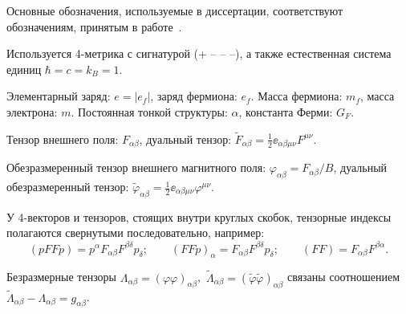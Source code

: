 \intro

%
%

\actualitysection
\actualitytext

\developmentsection
\developmenttext

\objectivesection
\objectivetext

\noveltysection
\noveltytext

{}

\methodssection
\methodstext

\resultssection
\resultstext

\approbationsection
\approbationtext

\pubsection
\pubtext

\contribsection
\contribtext

\structsection
\structtext

\newpage

Основные обозначения, используемые в диссертации, соответствуют обозначениям, принятым в работе~\cite{KM_Book_2013}.

Используется 4-метрика с сигнатурой (+ -- -- --), 
а также естественная система единиц $\hbar=c=k_B = 1$.

Элементарный заряд: $e = |e_f|$, заряд фермиона: $e_f$. Масса фермиона: $m_f$, масса электрона: $m$. Постоянная тонкой структуры: $\alpha$, 
константа Ферми: $G_F$.

Тензор внешнего поля: $F_{\alpha \beta}$, 
дуальный тензор: 
${\tilde F}_{\alpha \beta} = \frac{1}{2} \ee_{\alpha \beta
\mu \nu} F^{\mu \nu}$.

Обезразмеренный тензор внешнего магнитного поля: 
$\varphi_{\alpha \beta} =  F_{\alpha \beta} /B$,  
дуальный обезразмеренный тензор:
${\tilde \varphi}_{\alpha \beta} = \frac{1}{2} \ee_{\alpha \beta
\mu \nu} \varphi^{\mu \nu}$.

У 4-векторов и тензоров, стоящих внутри круглых скобок, тензорные индексы 
полагаются свернутыми последовательно, например:
%
$$(p F F p) = p^{\alpha} F_{\alpha 
\beta} F^{\beta \delta} p_{\delta}; \qquad
(F F p)_\alpha = F_{\alpha 
\beta} F^{\beta \delta} p_{\delta}; \qquad
(F F) = F_{\alpha \beta} F^{\beta \alpha}.$$

Безразмерные тензоры
$\Lambda_{\alpha \beta} = (\varphi \varphi)_{\alpha \beta}$,\,  
$\widetilde \Lambda_{\alpha \beta} = 
(\tilde \varphi \tilde \varphi)_{\alpha \beta}$ связаны соотношением
$\widetilde \Lambda_{\alpha \beta} - \Lambda_{\alpha \beta} = 
g_{\alpha \beta}$.
 
